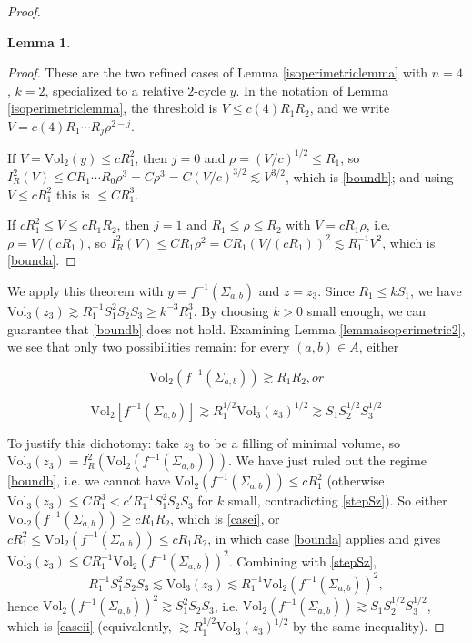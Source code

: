 \documentclass{amsart}
\newtheorem*{theorem 1}{Theorem 1}
\newtheorem*{theorem 2}{Theorem 2}
\newtheorem*{theorem 3}{Theorem 3}
\newtheorem{lemma}{Lemma}[section]
\numberwithin{equation}{section}
\newcommand{\Vol}{\textrm{Vol}}
\begin{document}
\begin{proof}
\begin{lemma}
\end{lemma}

\begin{proof} These are the two refined cases of
Lemma \ref{isoperimetriclemma} with $n = 4$, $k = 2$, specialized
to a relative $2$-cycle $y$.  In the notation of
Lemma \ref{isoperimetriclemma}, the threshold is $V \le c(4) R_1
R_2$, and we write $V = c(4) R_1 \cdots R_j \rho^{2-j}$.

If $V = \Vol_2(y) \le c R_1^2$, then $j = 0$ and $\rho =
(V/c)^{1/2} \le R_1$, so
$I_R^2(V) \le C R_1 \cdots R_0 \rho^{3} = C \rho^3 = C
(V/c)^{3/2} \lesssim V^{3/2}$, which is \eqref{boundb}; and using
$V \le c R_1^2$ this is $\le C R_1^3$.

If $c R_1^2 \le V \le c R_1 R_2$, then $j = 1$ and $R_1 \le \rho
\le R_2$ with $V = c R_1 \rho$, i.e. $\rho = V/(c R_1)$, so
$I_R^2(V) \le C R_1 \rho^{2} = C R_1 (V/(c R_1))^2 \lesssim R_1^{-1}
V^2$, which is \eqref{bounda}.
\end{proof}

We apply this theorem with $y = f^{-1}(\Sigma_{a,b})$ and $z = z_3$.   Since $R_1 \le k S_1$,  we have $\Vol_3(z_3) \gtrsim R_1^{-1} S_1^2 S_2 S_3 \ge k^{-3} R_1^3$.   By choosing $k > 0$ small enough,  we can guarantee that \eqref{boundb} does not hold.   Examining Lemma \ref{lemmaisoperimetric2},  we see that only two possibilities remain: for every $(a,b) \in A$,  either

\begin{equation} \label{casei} \Vol_2(f^{-1}(\Sigma_{a,b})) \gtrsim R_1 R_2,  or \end{equation}

\begin{equation} \label{caseii} \Vol_2[f^{-1}(\Sigma_{a,b})] \gtrsim R_1^{1/2} \Vol_3(z_3)^{1/2} \gtrsim S_1 S_2^{1/2} S_3^{1/2} \end{equation}

To justify this dichotomy: take $z_3$ to be a filling of minimal
volume, so $\Vol_3(z_3) = I_R^2(\Vol_2(f^{-1}(\Sigma_{a,b})))$.
We have just ruled out the regime \eqref{boundb}, i.e. we cannot
have $\Vol_2(f^{-1}(\Sigma_{a,b})) \le c R_1^2$ (otherwise
$\Vol_3(z_3) \le C R_1^3 < c' R_1^{-1} S_1^2 S_2 S_3$ for $k$ small,
contradicting \eqref{stepSz}).  So either
$\Vol_2(f^{-1}(\Sigma_{a,b})) \ge c R_1 R_2$, which is
\eqref{casei}, or $c R_1^2 \le \Vol_2(f^{-1}(\Sigma_{a,b})) \le c
R_1 R_2$, in which case \eqref{bounda} applies and gives
$\Vol_3(z_3) \le C R_1^{-1}\Vol_2(f^{-1}(\Sigma_{a,b}))^2$.
Combining with \eqref{stepSz},
$$ R_1^{-1} S_1^2 S_2 S_3 \lesssim \Vol_3(z_3) \lesssim R_1^{-1}
   \Vol_2(f^{-1}(\Sigma_{a,b}))^2, $$
hence $\Vol_2(f^{-1}(\Sigma_{a,b}))^2 \gtrsim S_1^2 S_2 S_3$, i.e.
$\Vol_2(f^{-1}(\Sigma_{a,b})) \gtrsim S_1 S_2^{1/2} S_3^{1/2}$,
which is \eqref{caseii} (equivalently, $\gtrsim R_1^{1/2}
\Vol_3(z_3)^{1/2}$ by the same inequality).


\end{proof}
\end{document}

